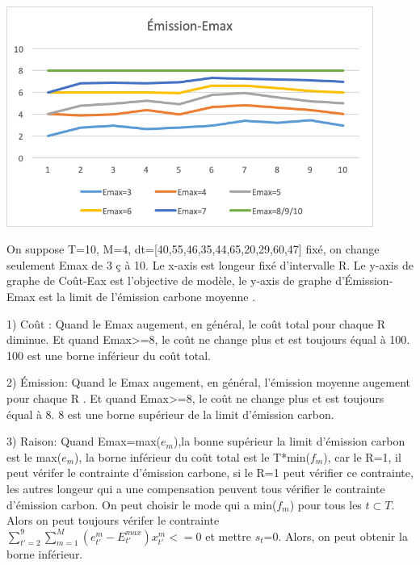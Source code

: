 \documentclass[12pt,a4paper]{article}
\begin{document}
\begin{minipage}[r]{.99\linewidth}
	\center\includegraphics[width=12cm]{img/change/emission-emax.png}
	\begin{center}
	\end{center}
\end{minipage}

\begin{justify}
On suppose T=10, M=4, dt=[40,55,46,35,44,65,20,29,60,47] fixé, on change seulement Emax de 3 ç à 10. Le x-axis est longeur fixé d'intervalle R. Le y-axis de graphe de Coût-Eax est l'objective de modèle, le y-axis de graphe d'Émission-Emax est la limit de l'émission carbone moyenne .
\end{justify}
\begin{justify}
1) Coût : 
 Quand le Emax augement, en général, le coût total pour chaque R diminue. Et quand Emax>=8, le coût ne change plus et est toujours équal à 100. 100 est une borne inférieur du coût total.
\end{justify}
\begin{justify}
2) Émission: Quand le Emax augement, en général, l'émission moyenne augement pour chaque R . Et quand Emax>=8, le coût ne change plus et est toujours équal à 8. 8 est une borne supérieur de la limit d'émission carbon.
\end{justify}

\begin{justify}
3) Raison: Quand Emax=max($e_m$),la bonne supérieur la limit d'émission carbon est le max($e_m$), la borne inférieur du coût total est le T*min($f_m$), car le R=1, il peut vérifer le contrainte d'émission carbone, si le R=1 peut vérifier ce contrainte, les autres longeur qui a une compensation peuvent tous vérifier le contrainte d'émission carbon. On peut choisir le mode qui a min($f_m$) pour tous les $t \subset T$. Alors on peut toujours vérifer le contrainte $\sum_{t'=2}^{9}\sum_{m=1}^M(e_{t'}^m-E^{max}_{t'})x_{t'}^m<=0$ et mettre $s_t$=0. Alors, on peut obtenir la borne inférieur.
\end{justify}
\newpage
\end{document}
